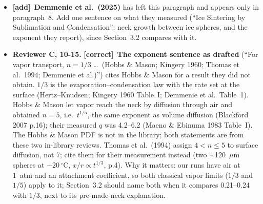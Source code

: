 \documentclass[11pt]{article}
\newcommand{\tC}{\textcolor{miss}{\textbf{[correct]}}\ }
\newcommand{\tA}{\textcolor{have}{\textbf{[add]}}\ }
\newcommand{\add}[1]{\textcolor{revX}{#1}}
\begin{document}
\begin{enumerate}
\begin{itemize}
    size, and find a good match at $-20\,^{\circ}$C and slower growth than
    predicted at $-5\,^{\circ}$C (checked against the PDF, 10-14). The
    exponent $0.23 \pm 0.03$ at $-20\,^{\circ}$C is our fit to their nine
    points and moves with the fit protocol (0.20--0.24); 0.135 is our
    phase-field model's, not theirs (\texttt{studies/molaro\_2019/exponents}).
    Any exponent quoted for their data in the paper is ours, and must say so.
  \item \tA \textbf{Demmenie et al.\ (2025)} has left this paragraph and
    appears only in paragraph~8. Add one sentence on what they measured
    (``Ice Sintering by Sublimation and Condensation'': neck growth between
    ice spheres, and the exponent they report), since Section~3.2 compares
    with it.
  \item \add{\textbf{Reviewer C, 10-15.} \tC \textbf{The exponent sentence
    as drafted} (``For vapor transport, $n=1/3$ \ldots\ (Hobbs \& Mason;
    Kingery 1960; Thomas et al.\ 1994; Demmenie et al.)'') cites Hobbs \&
    Mason for a result they did not obtain. $1/3$ is the evaporation--condensation
    law with the rate set at the surface (Hertz--Knudsen; Kingery 1960
    Table~I; Demmenie et al.\ Table~1). Hobbs \& Mason let vapor reach the
    neck by diffusion through air and obtained $n = 5$, i.e.\ $t^{1/5}$, the
    same exponent as volume diffusion (Blackford 2007 p.16); their measured
    $q$ was 4.2--6.2 (Maeno \& Ebinuma 1983 Table~I). The Hobbs \& Mason PDF
    is not in the library; both statements are from these two in-library
    reviews. Thomas et al.\ (1994) assign $4 < n \le 5$ to surface
    diffusion, not 7; cite them for their measurement instead (two
    $\sim$120~$\mu$m spheres at $-20\,^{\circ}$C, $x/r \propto t^{1/3}$,
    p.4). Why it matters: our runs have air at 1~atm and an attachment
    coefficient, so both classical vapor limits ($1/3$ and $1/5$) apply to
    it; Section~3.2 should name both when it compares 0.21--0.24 with $1/3$,
    next to its pre-made-neck explanation.}

\end{itemize}
\end{enumerate}
\end{document}
